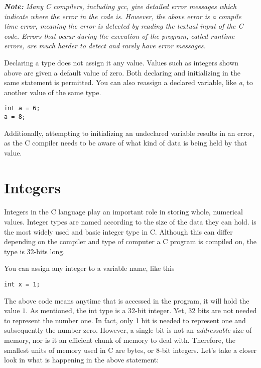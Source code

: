 \emph{\textbf{Note:} Many C compilers, including gcc, give detailed error messages which indicate where the error in the code is. However, the above error is a compile time error, meaning the error is detected by reading the textual input of the C code. Errors that occur during the execution of the program, called runtime errors, are much harder to detect and rarely have error messages.} \\

\par Declaring a type does not assign it any value. Values such as integers shown above are given a default value of zero. Both declaring and initializing in the same statement is permitted. You can also reassign a declared variable, like \emph{a}, to another value of the same type.

\begin{lstlisting}[style=customc]
int a = 6;
a = 8;
\end{lstlisting}

Additionally, attempting to initializing an undeclared variable results in an error, as the C compiler needs to be aware of what kind of data is being held by that value.

\section{Integers}

\paragraph{   } Integers in the C language play an important role in storing whole, numerical values. Integer types are named according to the size of the data they can hold.  is the most widely used and basic integer type in C. Although this can differ depending on the compiler and type of computer a C program is compiled on, the  type is 32-bits long.
\par You can assign any integer to a variable name, like this

\begin{lstlisting}[style=customc]
int x = 1;
\end{lstlisting}

The above code means anytime that  is accessed in the program, it will hold the value $1$. As mentioned, the int type is a 32-bit integer. Yet, 32 bits are not needed to represent the number one. In fact, only 1 bit is needed to represent one and subsequently the number zero. However, a single bit is not an \textit{addressable} size of memory, nor is it an efficient chunk of memory to deal with. Therefore, the smallest units of memory used in C are bytes, or 8-bit integers. Let's take a closer look in what is happening in the above statement:

